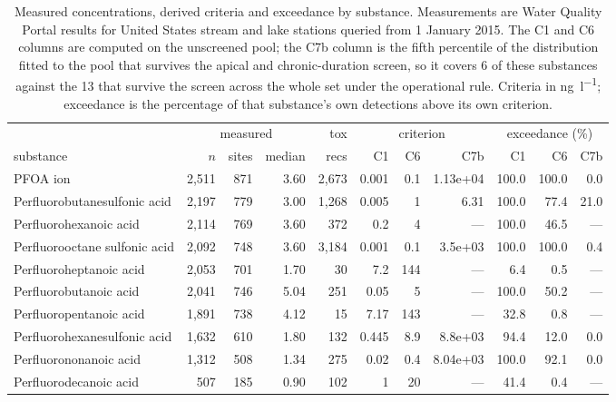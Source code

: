 \begin{table}[p]\centering\tiny\setlength{\tabcolsep}{2.2pt}
\caption{Measured concentrations, derived criteria and exceedance by substance. Measurements are Water Quality Portal results for United States stream and lake stations queried from 1 January 2015. The C1 and C6 columns are computed on the unscreened pool; the C7b column is the fifth percentile of the distribution fitted to the pool that survives the apical and chronic-duration screen, so it covers 6 of these substances against the 13 that survive the screen across the whole set under the operational rule. Criteria in \si{\nano\gram\per\litre}; exceedance is the percentage of that substance's own detections above its own criterion. }
\label{tab:persub}
\begin{tabular}{@{}>{\raggedright\arraybackslash}p{37mm} rrr r rrr rrr@{}}\toprule
& \multicolumn{3}{c}{measured} & tox & \multicolumn{3}{c}{criterion} & \multicolumn{3}{c}{exceedance (\%)}\\
\cmidrule(lr){2-4}\cmidrule(lr){6-8}\cmidrule(lr){9-11}
substance & $n$ & sites & median & recs & C1 & C6 & C7b & C1 & C6 & C7b\\\midrule
\textsf{PFOA ion} & 2,511 & 871 & 3.60 & 2,673 & 0.001 & 0.1 & 1.13e+04 & 100.0 & 100.0 & 0.0\\
\textsf{Perfluorobutanesulfonic acid} & 2,197 & 779 & 3.00 & 1,268 & 0.005 & 1 & 6.31 & 100.0 & 77.4 & 21.0\\
\textsf{Perfluorohexanoic acid} & 2,114 & 769 & 3.60 & 372 & 0.2 & 4 & --- & 100.0 & 46.5 & ---\\
\textsf{Perfluorooctane sulfonic acid} & 2,092 & 748 & 3.60 & 3,184 & 0.001 & 0.1 & 3.5e+03 & 100.0 & 100.0 & 0.4\\
\textsf{Perfluoroheptanoic acid} & 2,053 & 701 & 1.70 & 30 & 7.2 & 144 & --- & 6.4 & 0.5 & ---\\
\textsf{Perfluorobutanoic acid} & 2,041 & 746 & 5.04 & 251 & 0.05 & 5 & --- & 100.0 & 50.2 & ---\\
\textsf{Perfluoropentanoic acid} & 1,891 & 738 & 4.12 & 15 & 7.17 & 143 & --- & 32.8 & 0.8 & ---\\
\textsf{Perfluorohexanesulfonic acid} & 1,632 & 610 & 1.80 & 132 & 0.445 & 8.9 & 8.8e+03 & 94.4 & 12.0 & 0.0\\
\textsf{Perfluorononanoic acid} & 1,312 & 508 & 1.34 & 275 & 0.02 & 0.4 & 8.04e+03 & 100.0 & 92.1 & 0.0\\
\textsf{Perfluorodecanoic acid} & 507 & 185 & 0.90 & 102 & 1 & 20 & --- & 41.4 & 0.4 & ---\\

\end{tabular}
\end{table}
